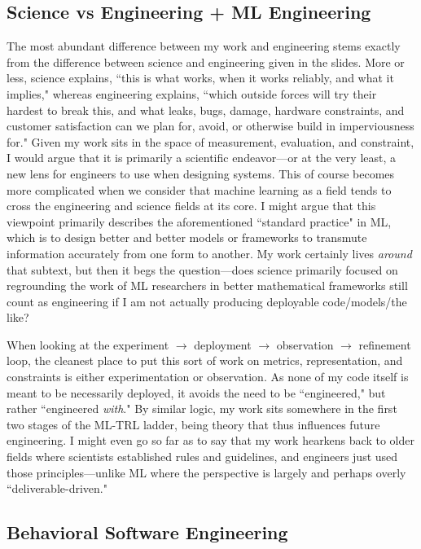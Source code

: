\documentclass{article}
\begin{document}
\subsection{Science vs Engineering + ML Engineering}
The most abundant difference between my work and engineering stems exactly from the difference between science and engineering given in the slides. 
More or less, science explains, ``this is what works, when it works reliably, and what it implies," whereas engineering explains, ``which outside forces will try their hardest to break this, and what leaks, bugs, damage, hardware constraints, and customer satisfaction can we plan for, avoid, or otherwise build in imperviousness for." 
Given my work sits in the space of measurement, evaluation, and constraint, I would argue that it is primarily a scientific endeavor—or at the very least, a new lens for engineers to use when designing systems.
This of course becomes more complicated when we consider that machine learning as a field tends to cross the engineering and science fields at its core. 
I might argue that this viewpoint primarily describes the aforementioned ``standard practice" in ML, which is to design better and better models or frameworks to transmute information accurately from one form to another. 
My work certainly lives \textit{around} that subtext, but then it begs the question—does science primarily focused on regrounding the work of ML researchers in better mathematical frameworks still count as engineering if I am not actually producing deployable code/models/the like?

When looking at the experiment $\rightarrow$ deployment $\rightarrow$ observation $\rightarrow$ refinement loop, the cleanest place to put this sort of work on metrics, representation, and constraints is either experimentation or observation. 
As none of my code itself is meant to be necessarily deployed, it avoids the need to be ``engineered," but rather ``engineered \textit{with}."
By similar logic, my work sits somewhere in the first two stages of the ML-TRL ladder, being theory that thus influences future engineering.
I might even go so far as to say that my work hearkens back to older fields where scientists established rules and guidelines, and engineers just used those principles—unlike ML where the perspective is largely and perhaps overly ``deliverable-driven."

\subsection{Behavioral Software Engineering}
\end{document}
